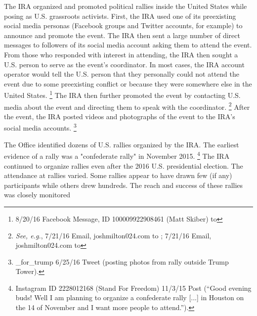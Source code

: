The IRA organized and promoted political rallies inside the United States while posing as U.S. grassroots activists.
First, the IRA used one of its preexisting social media personas (Facebook groups and Twitter accounts, for example) to announce and promote the event.
The IRA then sent a large number of direct messages to followers of its social media account asking them to attend the event.
From those who responded with interest in attending, the IRA then sought a U.S. person to serve as the event's coordinator.
In most cases, the IRA account operator would tell the U.S. person that they personally could not attend the event due to some preexisting conflict or because they were somewhere else in the United States.%
\footnote{8/20/16 Facebook Message, ID 100009922908461 (Matt Skiber) to }
The IRA then further promoted the event by contacting U.S. media about the event and directing them to speak with the coordinator.%
\footnote{\textit{See, e.g.}, 7/21/16 Email, joshmilton024\@gmail.com to ;
7/21/16 Email, joshmilton024\@gmail.com to }
After the event, the IRA posted videos and photographs of the event to the IRA's  social media accounts.%
\footnote{\@march\_for\_trump 6/25/16 Tweet (posting photos from rally outside Trump Tower).}

The Office identified dozens of U.S. rallies organized by the IRA. The earliest evidence of a rally was a "confederate rally" in November 2015.%
\footnote{Instagram ID 2228012168 (Stand For Freedom) 11/3/15 Post (“Good evening buds!
Well I am planning to organize a confederate rally [...] in Houston on the 14 of November and I want more people to attend.”).}
The IRA continued to organize rallies even after the 2016 U.S. presidential election.
The attendance at rallies varied.
Some rallies appear to have drawn few (if any) participants while others drew hundreds.
The reach and success of these rallies was closely monitored 

